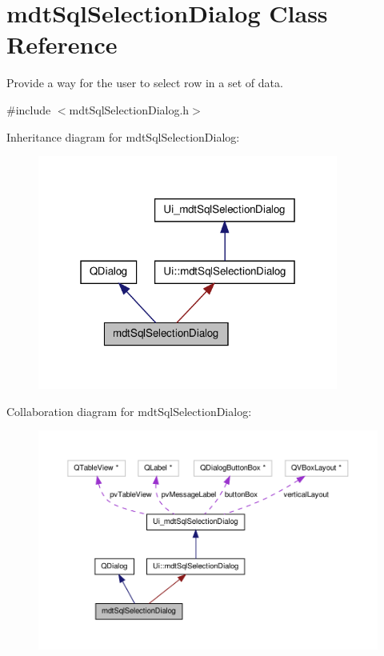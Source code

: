 \hypertarget{classmdt_sql_selection_dialog}{\section{mdt\-Sql\-Selection\-Dialog Class Reference}
\label{classmdt_sql_selection_dialog}
}


Provide a way for the user to select row in a set of data.  




{\ttfamily \#include $<$mdt\-Sql\-Selection\-Dialog.\-h$>$}



Inheritance diagram for mdt\-Sql\-Selection\-Dialog\-:
\nopagebreak
\begin{figure}[H]
\begin{center}
\leavevmode
\includegraphics[width=280pt]{classmdt_sql_selection_dialog__inherit__graph}
\end{center}
\end{figure}


Collaboration diagram for mdt\-Sql\-Selection\-Dialog\-:
\nopagebreak
\begin{figure}[H]
\begin{center}
\leavevmode
\includegraphics[width=350pt]{classmdt_sql_selection_dialog__coll__graph}
\end{center}
\end{figure}
